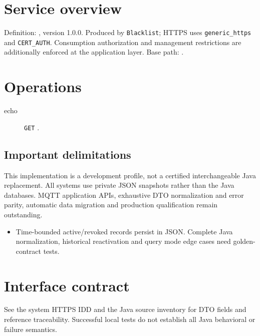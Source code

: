 \documentclass[a4paper]{arrowhead}
\begin{document}
\ArrowheadSetup
\section{Service overview}
Definition: , version 1.0.0. Produced by \texttt{Blacklist}; HTTPS uses \texttt{generic\_https} and \texttt{CERT\_AUTH}. Consumption authorization and management restrictions are additionally enforced at the application layer. Base path: .
\section{Operations}
\begin{description}
\item[echo] \texttt{GET} .
\end{description}
\subsection{Important delimitations}
This implementation is a development profile, not a certified interchangeable Java replacement. All systems use private JSON snapshots rather than the Java databases. MQTT application APIs, exhaustive DTO normalization and error parity, automatic data migration and production qualification remain outstanding.
\begin{itemize}
\item Time-bounded active/revoked records persist in JSON. Complete Java normalization, historical reactivation and query mode edge cases need golden-contract tests.
\end{itemize}
\section{Interface contract}
See the system HTTPS IDD and the Java source inventory for DTO fields and reference traceability. Successful local tests do not establish all Java behavioral or failure semantics.
\end{document}
